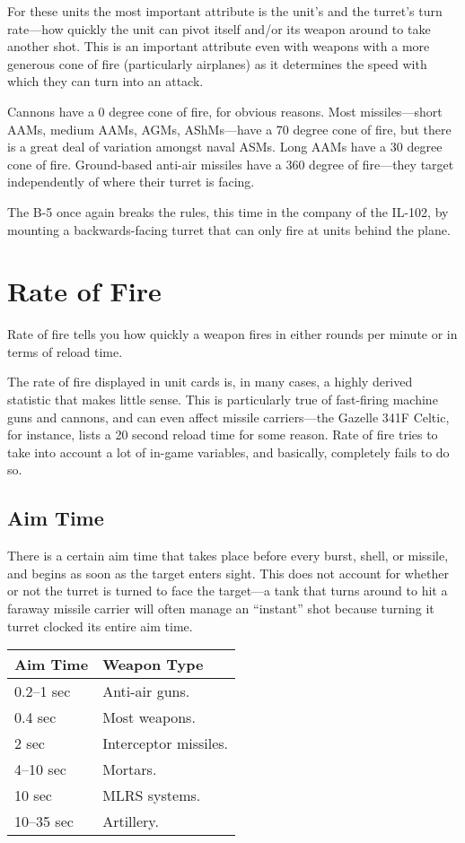 \documentclass{article}
\begin{document}
For these units the most important attribute is the unit's and the turret's turn
rate---how quickly the unit can pivot itself and/or its weapon around to take
another shot. This is an important attribute even with weapons with a more
generous cone of fire (particularly airplanes) as it determines the speed with
which they can turn into an attack.

Cannons have a 0 degree cone of fire, for obvious reasons. Most
missiles---short AAMs, medium AAMs, AGMs, AShMs---have a 70 degree cone of
fire, but there is a great deal of variation amongst naval
ASMs. Long AAMs have a 30 degree cone of fire. Ground-based anti-air missiles
have a 360 degree of fire---they target independently of where their turret is
facing.

The B-5 once again breaks the rules, this time in the company of the IL-102, by
mounting a backwards-facing turret that can only fire at units behind the plane.

\section{Rate of Fire}

Rate of fire tells you how quickly a weapon fires in either rounds per minute
or in terms of reload time.

The rate of fire displayed in unit cards is, in many cases, a highly derived
statistic that makes little sense. This is particularly true of fast-firing
machine guns and cannons, and can even affect missile carriers---the Gazelle
341F Celtic, for instance, lists a 20 second reload time for some reason. Rate
of fire tries to take into account a lot of in-game variables, and
basically, completely fails to do so.

\subsection{Aim Time}

There is a certain aim time that takes place before every burst,
shell, or missile, and begins as soon as the target enters sight. This does not
account for whether or not the turret is turned to face the target---a tank
that turns around to hit a faraway missile carrier will often manage an
``instant'' shot because turning it turret clocked its entire aim
time.

\begin{center}
    \begin{tabular}{ | l | l | }
    \hline
    Aim Time & Weapon Type \\ \hline
    0.2--1 sec & Anti-air guns. \\
    0.4 sec & Most weapons. \\
    2 sec & Interceptor missiles. \\ 
    4--10 sec & Mortars. \\
    10 sec & MLRS systems. \\
    10--35 sec & Artillery. \\
    \hline
    \end{tabular}
\end{center}
\end{document}
